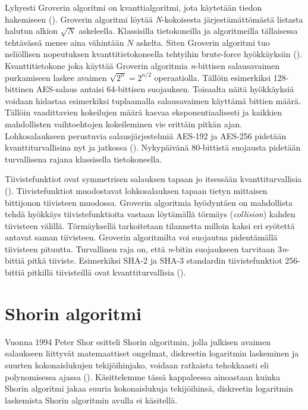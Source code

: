  Lyhyesti Groverin algoritmi on kvanttialgoritmi, jota käytetään tiedon hakemiseen (\cite{hayward2008quantum}). Groverin algoritmi löytää \emph{N}-kokoisesta järjestämättömästä listasta halutun alkion $\sqrt{N}$ askeleella. Klassisilla tietokoneilla ja algoritmeilla tällaisessa tehtävässä menee aina vähintään $N$ askelta. Siten Groverin algoritmi tuo neliöllisen nopeutuksen kvanttitietokoneella tehtyihin brute-force hyökkäyksiin (\cite{mavroeidis2018impact}). Kvanttitietokone joka käyttää Groverin algoritmia \emph{n}-bittisen salausavaimen purkamiseen laskee avaimen $\sqrt{2^{n}} = 2^{n/2}$ operaatiolla. Tällöin esimerkiksi 128-bittinen AES-salaus antaisi 64-bittisen suojauksen. Toisaalta näitä hyökkäyksiä voidaan hidastaa esimerkiksi tuplaamalla salausavaimen käyttämä bittien määrä. Tällöin vaadittavien kokeilujen määrä kasvaa eksponentiaalisesti ja kaikkien mahdollisten vaihtoehtojen kokeileminen vie erittäin pitkän ajan. Lohkosalaukseen perustuvia salausjärjestelmiä AES-192 ja AES-256 pidetään kvanttiturvallisina nyt ja jatkossa (\cite{mavroeidis2018impact}). Nykypäivänä 80-bittistä suojausta pidetään turvallisena rajana klassisella tietokoneella.
 
  Tiivistefunktiot ovat symmetrisen salauksen tapaan jo itsessään kvanttiturvallisia (\cite{mavroeidis2018impact}). Tiivistefunktiot muodostavat lohkosalauksen tapaan tietyn mittaisen bittijonon tiivisteen muodossa. Groverin algoritmia hyödyntäen on mahdollista tehdä hyökkäys tiivistefunktioita vastaan löytämällä törmäys (\emph{collision}) kahden tiivisteen välillä. Törmäyksellä tarkoitetaan tilannetta milloin kaksi eri syötettä antavat saman tiivisteen. %
 Groverin algoritmilta voi suojautua pidentämällä tiivisteen pituutta. Turvallinen raja on, että \emph{n}-bitin suojaukseen tarvitaan 3\emph{n}-bittiä pitkä tiiviste. Esimerkiksi SHA-2 ja SHA-3 standardin tiivistefunktiot 256-bittiä pitkillä tiivisteillä ovat kvanttiturvallisia (\cite{mavroeidis2018impact, buchmann2016post}).
 
 

\section{Shorin algoritmi}
Vuonna 1994 Peter Shor esitteli Shorin algoritmin, jolla julkisen avaimen salaukseen liittyvät matemaattiset ongelmat, diskreetin logaritmin laskeminen ja suurten kokonaislukujen tekijöihinjako, voidaan ratkaista tehokkaasti eli polynomisessa ajassa (\cite{doi:10.1137/S0036144598347011}). Käsittelemme tässä kappaleessa ainoastaan kuinka Shorin algoritmi jakaa suuria kokonaislukuja tekijöihinsä, diskreetin logaritmin laskemista Shorin algoritmin avulla ei käsitellä.

